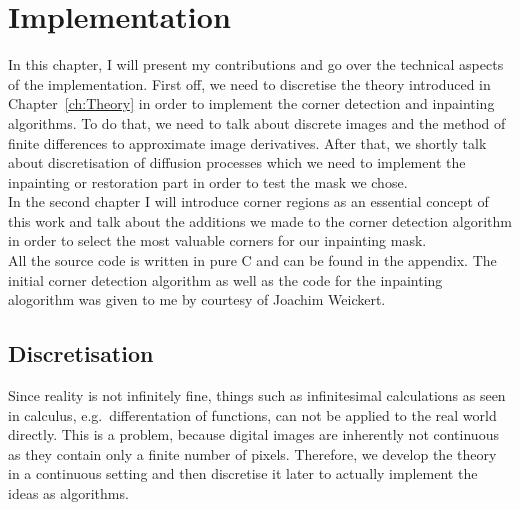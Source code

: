 \chapter{Implementation}\label{ch:Implementation} 
In this chapter, I will present my contributions and go over the technical aspects of the
implementation. First off, we need to discretise the theory introduced in Chapter~\ref{ch:Theory} in order
to implement the corner detection and inpainting algorithms. To do that, we need to talk about
discrete images and the method of finite differences to approximate image derivatives.
After that, we shortly talk about discretisation of diffusion processes which we need to implement
the inpainting or restoration part in order to test the mask we chose.\\  
In the second chapter I will introduce corner regions as an essential concept of this work and talk
about the additions we made to the corner detection algorithm in order to select the most valuable
corners for our inpainting mask.\\
All the source code is written in pure C and can be found in the appendix.
The initial corner detection algorithm as well as the code for the inpainting alogorithm was given
to me by courtesy of Joachim Weickert.

\section{Discretisation}\label{sec:Discretisation}
Since reality is not infinitely fine, things such as infinitesimal calculations as seen in 
calculus, e.g.\ differentation of functions, can not be applied to the real world directly.
This is a problem, because digital images are inherently not continuous as they contain only a
finite number of pixels. 
Therefore, we develop the theory in a continuous setting and then discretise it later to actually
implement the ideas as algorithms.

